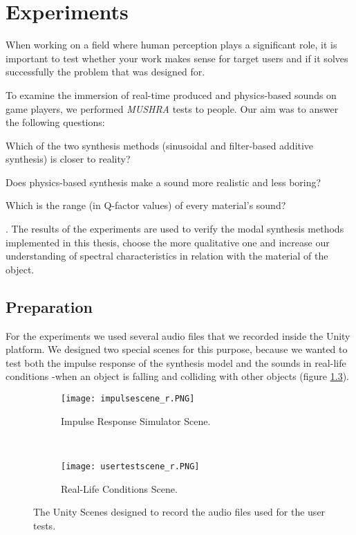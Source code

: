 \chapter{Experiments}\label{ch:tests}
When working on a field where human perception plays a significant role, it is important to test whether your work makes sense for target users and if it solves successfully the problem that was designed for.

To examine the immersion of real-time produced and physics-based sounds on game players, we performed \textit{MUSHRA}\cite{series2014method} tests to people. Our aim was to answer the following questions: \begin{inparaenum}[1)]
\item Which of the two synthesis methods (sinusoidal and filter-based additive synthesis) is closer to reality? 
\item Does physics-based synthesis make a sound more realistic and less boring?
\item Which is the range (in Q-factor values) of every material's sound?
\end{inparaenum}.
The results of the experiments are used to verify the modal synthesis methods implemented in this thesis, choose the more qualitative one and increase our understanding of spectral characteristics in relation with the material of the object. 

\section{Preparation}
For the experiments we used several audio files that we recorded inside the Unity\textsuperscript{\textregistered} platform. We designed two special scenes for this purpose, because we wanted to test both the impulse response of the synthesis model and the sounds in real-life conditions -when an object is falling and colliding with other objects (figure \ref{fig:test_scenes}). 

\begin{figure}[H]
    \centering
    \begin{subfigure}[b]{0.45\textwidth}
        \texttt{[image: impulsescene\_r.PNG]}
        \caption{Impulse Response Simulator Scene.}
        \label{fig:test_sc1}
    \end{subfigure}
    ~ %
    \begin{subfigure}[b]{0.45\textwidth}
        \texttt{[image: usertestscene\_r.PNG]}
        \caption{Real-Life Conditions Scene.}
        \label{fig:test_sc2}
    \end{subfigure}
    \caption{The Unity\textsuperscript{\textregistered} Scenes designed to record the audio files used for the user tests.}\label{fig:test_scenes}
\end{figure}

